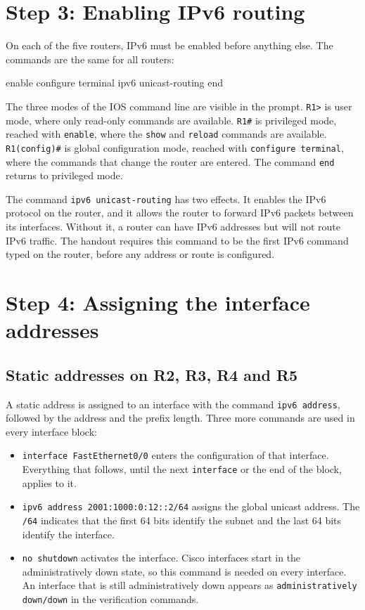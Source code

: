 \section{Step 3: Enabling IPv6 routing}

On each of the five routers, IPv6 must be enabled before anything else. The commands are the same for all routers:

\begin{codeblock}
enable
configure terminal
ipv6 unicast-routing
end
\end{codeblock}

The three modes of the IOS command line are visible in the prompt. \texttt{R1>} is user mode, where only read-only commands are available. \texttt{R1\#} is privileged mode, reached with \texttt{enable}, where the \texttt{show} and \texttt{reload} commands are available. \texttt{R1(config)\#} is global configuration mode, reached with \texttt{configure terminal}, where the commands that change the router are entered. The command \texttt{end} returns to privileged mode.

The command \texttt{ipv6 unicast-routing} has two effects. It enables the IPv6 protocol on the router, and it allows the router to forward IPv6 packets between its interfaces. Without it, a router can have IPv6 addresses but will not route IPv6 traffic. The handout requires this command to be the first IPv6 command typed on the router, before any address or route is configured.

\section{Step 4: Assigning the interface addresses}

\subsection{Static addresses on R2, R3, R4 and R5}

A static address is assigned to an interface with the command \texttt{ipv6 address}, followed by the address and the prefix length. Three more commands are used in every interface block:

\begin{itemize}
\item \texttt{interface FastEthernet0/0} enters the configuration of that interface. Everything that follows, until the next \texttt{interface} or the end of the block, applies to it.
\item \texttt{ipv6 address 2001:1000:0:12::2/64} assigns the global unicast address. The \texttt{/64} indicates that the first 64 bits identify the subnet and the last 64 bits identify the interface.
\item \texttt{no shutdown} activates the interface. Cisco interfaces start in the administratively down state, so this command is needed on every interface. An interface that is still administratively down appears as \texttt{administratively down/down} in the verification commands.
\end{itemize}

